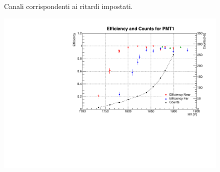 \begin{figure}[h]
	\centerline{}
	\centerline{}
	\caption{Canali corrispondenti ai ritardi impostati.}
	\label{chan_time}
\end{figure}
\begin{figure}[h]
	\centerline{\includegraphics[scale=0.8]{img/eff1.pdf}}
\end{figure}
